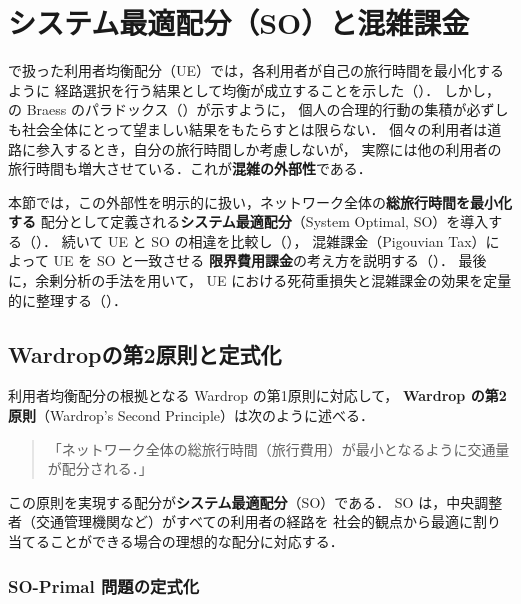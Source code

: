 
\section{システム最適配分（SO）と混雑課金}
\label{sec:ch5-so}

で扱った利用者均衡配分（UE）では，各利用者が自己の旅行時間を最小化するように
経路選択を行う結果として均衡が成立することを示した（）．
しかし，の Braess のパラドックス（）が示すように，
個人の合理的行動の集積が必ずしも社会全体にとって望ましい結果をもたらすとは限らない．
個々の利用者は道路に参入するとき，自分の旅行時間しか考慮しないが，
実際には他の利用者の旅行時間も増大させている．これが\textbf{混雑の外部性}である．

本節では，この外部性を明示的に扱い，ネットワーク全体の\textbf{総旅行時間を最小化する}
配分として定義される\textbf{システム最適配分}（System Optimal, SO）を導入する（）．
続いて UE と SO の相違を比較し（），
混雑課金（Pigouvian Tax）によって UE を SO と一致させる
\textbf{限界費用課金}の考え方を説明する（）．
最後に，余剰分析の手法を用いて，
UE における死荷重損失と混雑課金の効果を定量的に整理する（）\cite{Pigou1920,Beckmann1956}．

\subsection{Wardropの第2原則と定式化}
\label{subsec:wardrop2}

利用者均衡配分の根拠となる Wardrop の第1原則に対応して，
\textbf{Wardrop の第2原則}（Wardrop's Second Principle）は次のように述べる\cite{Wardrop1952}．

\begin{quotation}
  \noindent
  「ネットワーク全体の総旅行時間（旅行費用）が最小となるように交通量が配分される．」
\end{quotation}

この原則を実現する配分が\textbf{システム最適配分}（SO）である．
SO は，中央調整者（交通管理機関など）がすべての利用者の経路を
社会的観点から最適に割り当てることができる場合の理想的な配分に対応する．

\subsubsection*{SO-Primal 問題の定式化}

